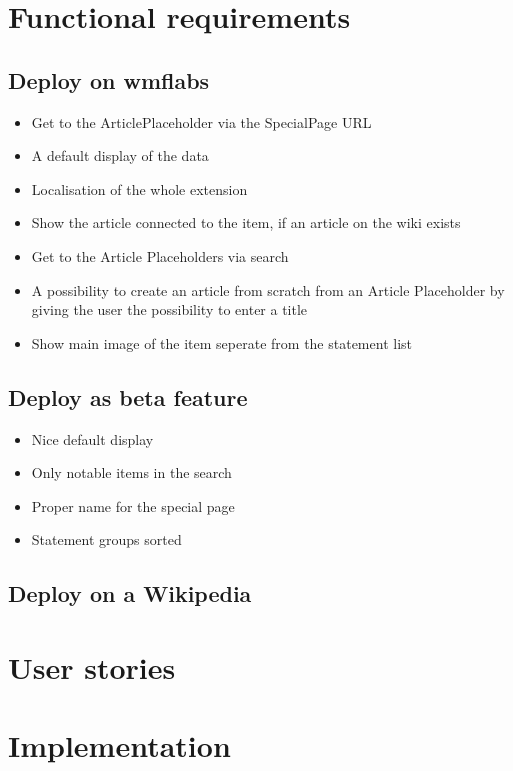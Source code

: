 \documentclass[11pt]{article}
\begin{document}
\section{Functional requirements}

\subsection[wmflabs]{Deploy on wmflabs}
\begin{itemize}
\item Get to the ArticlePlaceholder via the SpecialPage URL
\item A default display of the data
\item Localisation of the whole extension
\item Show the article connected to the item, if an article on the wiki exists
\item Get to the Article Placeholders via search
\item A possibility to create an article from scratch from an Article Placeholder by giving the user the possibility to enter a title
\item Show main image of the item seperate from the statement list
\end{itemize}

\subsection[betafeature]{Deploy as beta feature}
\begin{itemize}
\item Nice default display
\item Only notable items in the search
\item Proper name for the special page
\item Statement groups sorted
\end{itemize}

\subsection[deploy]{Deploy on a Wikipedia}

\section{User stories}

\section{Implementation}
\end{document}
